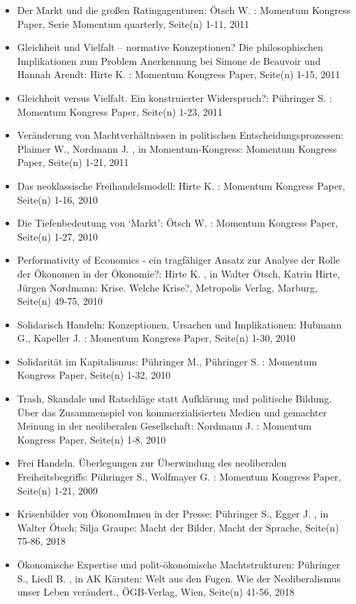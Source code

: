 \begin{itemize}
\item Der Markt und die großen Ratingagenturen: Ötsch W. : Momentum Kongress Paper, Serie Momentum quarterly, Seite(n) 1-11, 2011
\item Gleichheit und Vielfalt – normative Konzeptionen? Die philosophischen Implikationen zum Problem Anerkennung bei Simone de Beauvoir und Hannah Arendt: Hirte K. : Momentum Kongress Paper, Seite(n) 1-15, 2011
\item Gleichheit versus Vielfalt. Ein konstruierter Widerspruch?: Pühringer S. : Momentum Kongress Paper, Seite(n) 1-23, 2011
\item Veränderung von Machtverhältnissen in politischen Entscheidungsprozessen: Plaimer W., Nordmann J. , in Momentum-Kongress: Momentum Kongress Paper, Seite(n) 1-21, 2011
\item Das neoklassische Freihandelsmodell: Hirte K. : Momentum Kongress Paper, Seite(n) 1-16, 2010
\item Die Tiefenbedeutung von ‘Markt’: Ötsch W. : Momentum Kongress Paper, Seite(n) 1-27, 2010
\item Performativity of Economics - ein tragfähiger Ansatz zur Analyse der Rolle der Ökonomen in der Ökonomie?: Hirte K. , in Walter Ötsch, Katrin Hirte, Jürgen Nordmann: Krise. Welche Krise?, Metropolis Verlag, Marburg, Seite(n) 49-75, 2010
\item Solidarisch Handeln: Konzeptionen, Ursachen und Implikationen: Hubmann G., Kapeller J. : Momentum Kongress Paper, Seite(n) 1-30, 2010
\item Solidarität im Kapitalismus: Pühringer M., Pühringer S. : Momentum Kongress Paper, Seite(n) 1-32, 2010
\item Trash, Skandale und Ratschläge statt Aufklärung und politische Bildung. Über das Zusammenspiel von kommerzialisierten Medien und gemachter Meinung in der neoliberalen Gesellschaft: Nordmann J. : Momentum Kongress Paper, Seite(n) 1-8, 2010
\item Frei Handeln. Überlegungen zur Überwindung des neoliberalen Freiheitsbegriffs: Pühringer S., Wolfmayer G. : Momentum Kongress Paper, Seite(n) 1-21, 2009
\item Krisenbilder von ÖkonomInnen in der Presse: Pühringer S., Egger J. , in Walter Ötsch; Silja Graupe: Macht der Bilder, Macht der Sprache, Seite(n) 75-86, 2018
\item Ökonomische Expertise und polit-ökonomische Machtstrukturen: Pühringer S., Liedl B. , in AK Kärnten: Welt aus den Fugen. Wie der Neoliberalismus unser Leben verändert., ÖGB-Verlag, Wien, Seite(n) 41-56, 2018

\end{itemize}
